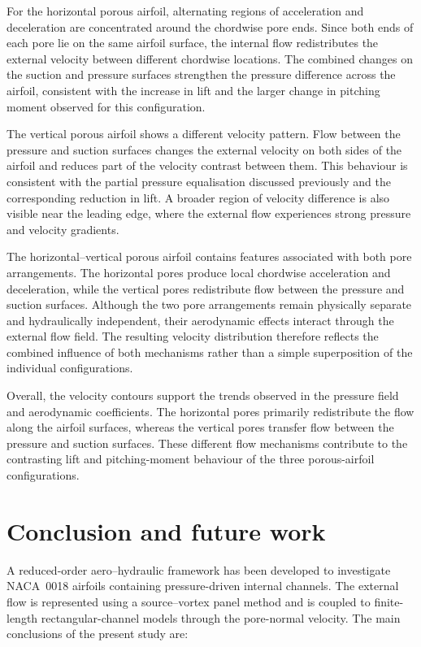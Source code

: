 \documentclass[a4paper,fleqn]{cas-dc}
\begin{document}
	For the horizontal porous airfoil, alternating regions of acceleration
	and deceleration are concentrated around the chordwise pore ends. Since
	both ends of each pore lie on the same airfoil surface, the internal
	flow redistributes the external velocity between different chordwise
	locations. The combined changes on the suction and pressure surfaces
	strengthen the pressure difference across the airfoil, consistent with
	the increase in lift and the larger change in pitching moment observed
	for this configuration.
	
	The vertical porous airfoil shows a different velocity pattern. Flow
	between the pressure and suction surfaces changes the external velocity
	on both sides of the airfoil and reduces part of the velocity contrast
	between them. This behaviour is consistent with the partial pressure
	equalisation discussed previously and the corresponding reduction in
	lift. A broader region of velocity difference is also visible near the
	leading edge, where the external flow experiences strong pressure and
	velocity gradients.
	
	The horizontal--vertical porous airfoil contains features associated
	with both pore arrangements. The horizontal pores produce local
	chordwise acceleration and deceleration, while the vertical pores
	redistribute flow between the pressure and suction surfaces. Although
	the two pore arrangements remain physically separate and hydraulically
	independent, their aerodynamic effects interact through the external
	flow field. The resulting velocity distribution therefore reflects the
	combined influence of both mechanisms rather than a simple
	superposition of the individual configurations.
	
	Overall, the velocity contours support the trends observed in the
	pressure field and aerodynamic coefficients. The horizontal pores
	primarily redistribute the flow along the airfoil surfaces, whereas the
	vertical pores transfer flow between the pressure and suction surfaces.
	These different flow mechanisms contribute to the contrasting lift and
	pitching-moment behaviour of the three porous-airfoil configurations.
	
	
	
	\section{Conclusion and future work}
	\label{sec:conclusion}
	
	A reduced-order aero--hydraulic framework has been developed to investigate
	NACA~0018 airfoils containing pressure-driven internal channels. The external
	flow is represented using a source--vortex panel method and is coupled to
	finite-length rectangular-channel models through the pore-normal velocity.
	The main conclusions of the present study are:
	
\end{document}
